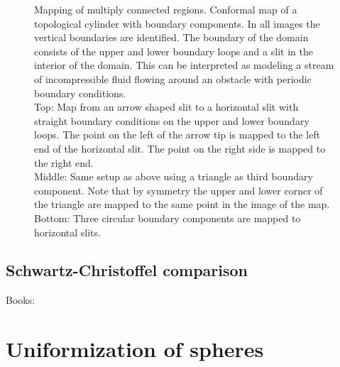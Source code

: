 \documentclass[Thesis.tex]{subfiles}
\begin{document}
  \begin{figure}
  	\centering
  \caption{
  Mapping of multiply connected regions.
  Conformal map of a topological cylinder with boundary components.
  In all images the vertical boundaries are identified.
  The boundary of the domain consists of the upper and lower boundary loops and a slit in the interior of the domain.
  This can be interpreted as modeling a stream of incompressible fluid flowing around an obstacle with periodic boundary conditions.
  \\
  Top: Map from an arrow shaped slit to a horizontal slit with straight boundary conditions on the upper and lower boundary loops.
  The point on the left of the arrow tip is mapped to the left end of the horizontal slit.
  The point on the right side is mapped to the right end.
  \\
  Middle: Same setup as above using a triangle as third boundary component.
  Note that by symmetry the upper and lower corner of the triangle are mapped to the same point in the image of the map.
  \\
  Bottom: Three circular boundary components are mapped to horizontal slits.
  }
  \end{figure}

  \subsection{Schwartz-Christoffel comparison}
  Books: \cite{driscoll2002schwarz, nehari1952conformal, courant2005dirichlet, ford1951automorphic}

  \section{Uniformization of spheres}
\end{document}
